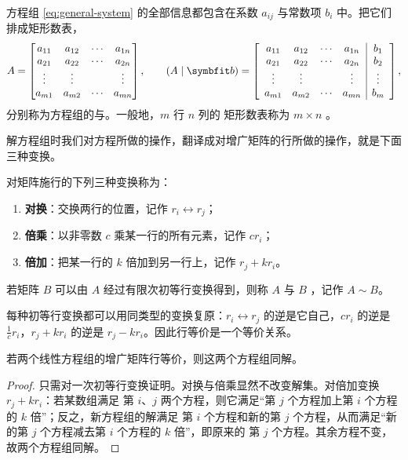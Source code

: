 方程组 \cref{eq:general-system} 的全部信息都包含在系数 $a_{ij}$ 与常数项 $b_i$ 中。把它们排成矩形数表，
\[
A=\begin{bmatrix}
a_{11} & a_{12} & \cdots & a_{1n}\\
a_{21} & a_{22} & \cdots & a_{2n}\\
\vdots & \vdots &        & \vdots\\
a_{m1} & a_{m2} & \cdots & a_{mn}
\end{bmatrix},
\qquad
(A\mid\vb{b})=\left[\begin{array}{cccc|c}
a_{11} & a_{12} & \cdots & a_{1n} & b_1\\
a_{21} & a_{22} & \cdots & a_{2n} & b_2\\
\vdots & \vdots &        & \vdots & \vdots\\
a_{m1} & a_{m2} & \cdots & a_{mn} & b_m
\end{array}\right],
\]
分别称为方程组的与。一般地，$m$ 行 $n$ 列的
矩形数表称为 $m\times n$ 。

解方程组时我们对方程所做的操作，翻译成对增广矩阵的行所做的操作，就是下面三种变换。

\begin{definition}\label{def:row-op}
对矩阵施行的下列三种变换称为：
\begin{enumerate}
  \item \textbf{对换}：交换两行的位置，记作 $r_i\leftrightarrow r_j$；
  \item \textbf{倍乘}：以非零数 $c$ 乘某一行的所有元素，记作 $cr_i$；
  \item \textbf{倍加}：把某一行的 $k$ 倍加到另一行上，记作 $r_j+kr_i$。
\end{enumerate}
若矩阵 $B$ 可以由 $A$ 经过有限次初等行变换得到，则称 $A$ 与 $B$ ，记作 $A\sim B$。
\end{definition}

每种初等行变换都可以用同类型的变换复原：$r_i\leftrightarrow r_j$ 的逆是它自己，$cr_i$ 的逆是
$\frac1cr_i$，$r_j+kr_i$ 的逆是 $r_j-kr_i$。因此行等价是一个等价关系。

\begin{theorem}\label{thm:row-equivalent}
若两个线性方程组的增广矩阵行等价，则这两个方程组同解。
\end{theorem}

\begin{proof}
只需对一次初等行变换证明。对换与倍乘显然不改变解集。对倍加变换 $r_j+kr_i$：若某数组满足
第 $i$、$j$ 两个方程，则它满足“第 $j$ 个方程加上第 $i$ 个方程的 $k$ 倍”；反之，新方程组的解满足
第 $i$ 个方程和新的第 $j$ 个方程，从而满足“新的第 $j$ 个方程减去第 $i$ 个方程的 $k$ 倍”，即原来的
第 $j$ 个方程。其余方程不变，故两个方程组同解。
\end{proof}

